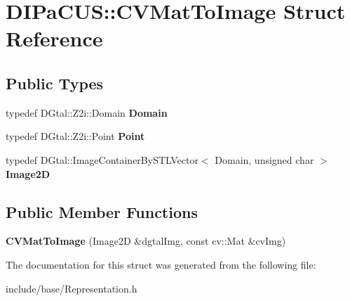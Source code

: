\hypertarget{structDIPaCUS_1_1CVMatToImage}{}\section{D\+I\+Pa\+C\+US\+:\+:C\+V\+Mat\+To\+Image Struct Reference}
\label{structDIPaCUS_1_1CVMatToImage}
\subsection*{Public Types}
\begin{DoxyCompactItemize}
\item 
\mbox{\label{structDIPaCUS_1_1CVMatToImage_a4d0d2b428045c0e74fec833ff345c3c5}} 
typedef D\+Gtal\+::\+Z2i\+::\+Domain {\bfseries Domain}
\item 
\mbox{\label{structDIPaCUS_1_1CVMatToImage_a67b35451230fb0fd49e8e11715d50a76}} 
typedef D\+Gtal\+::\+Z2i\+::\+Point {\bfseries Point}
\item 
\mbox{\label{structDIPaCUS_1_1CVMatToImage_a79399d436688fb60039d4ea931fca99b}} 
typedef D\+Gtal\+::\+Image\+Container\+By\+S\+T\+L\+Vector$<$ Domain, unsigned char $>$ {\bfseries Image2D}
\end{DoxyCompactItemize}
\subsection*{Public Member Functions}
\begin{DoxyCompactItemize}
\item 
\mbox{\label{structDIPaCUS_1_1CVMatToImage_a4e55efea1d46a324ffc43f5e9ec3773b}} 
{\bfseries C\+V\+Mat\+To\+Image} (Image2D \&dgtal\+Img, const cv\+::\+Mat \&cv\+Img)
\end{DoxyCompactItemize}


The documentation for this struct was generated from the following file\+:\begin{DoxyCompactItemize}
\item 
include/base/Representation.\+h\end{DoxyCompactItemize}
